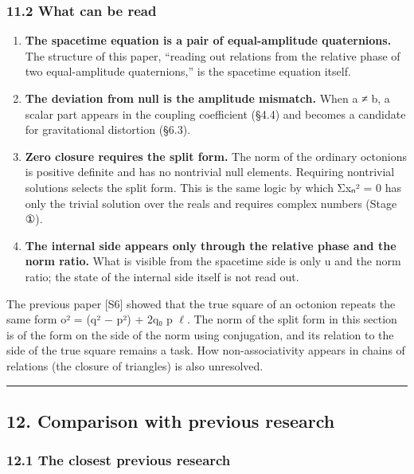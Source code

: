 \documentclass[
  a4paper,
]{article}
\providecommand{\tightlist}{%
  \setlength{\itemsep}{0pt}\setlength{\parskip}{0pt}}
\begin{document}
\subsubsection{11.2 What can be read}\label{what-can-be-read}

\begin{enumerate}
\def\labelenumi{\arabic{enumi}.}
\tightlist
\item
  \textbf{The spacetime equation is a pair of equal-amplitude
  quaternions.} The structure of this paper, ``reading out relations
  from the relative phase of two equal-amplitude quaternions,'' is the
  spacetime equation itself.
\item
  \textbf{The deviation from null is the amplitude mismatch.} When
  \textbar a\textbar{} ≠ \textbar b\textbar, a scalar part appears in
  the coupling coefficient (§4.4) and becomes a candidate for
  gravitational distortion (§6.3).
\item
  \textbf{Zero closure requires the split form.} The norm of the
  ordinary octonions is positive definite and has no nontrivial null
  elements. Requiring nontrivial solutions selects the split form. This
  is the same logic by which Σxₙ² = 0 has only the trivial solution over
  the reals and requires complex numbers (Stage ①).
\item
  \textbf{The internal side appears only through the relative phase and
  the norm ratio.} What is visible from the spacetime side is only u and
  the norm ratio; the state of the internal side itself is not read out.
\end{enumerate}

The previous paper {[}S6{]} showed that the true square of an octonion
repeats the same form o² = (q² − \textbar p\textbar²) + 2q₀ p \(\ell\).
The norm of the split form in this section is of the form on the side of
the norm using conjugation, and its relation to the side of the true
square remains a task. How non-associativity appears in chains of
relations (the closure of triangles) is also unresolved.

\begin{center}\rule{0.5\linewidth}{0.5pt}\end{center}

\subsection{12. Comparison with previous
research}\label{comparison-with-previous-research}

\subsubsection{12.1 The closest previous
research}\label{the-closest-previous-research}
\end{document}
